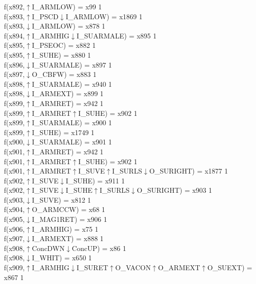 f(x892,$\uparrow$I\_ARMLOW) = x99 {1} \\
f(x893,$\uparrow$I\_PSCD$\downarrow$I\_ARMLOW) = x1869 {1} \\
f(x893,$\downarrow$I\_ARMLOW) = x878 {1} \\
f(x894,$\uparrow$I\_ARMHIG$\downarrow$I\_SUARMALE) = x895 {1} \\
f(x895,$\uparrow$I\_PSEOC) = x882 {1} \\
f(x895,$\uparrow$I\_SUHE) = x880 {1} \\
f(x896,$\downarrow$I\_SUARMALE) = x897 {1} \\
f(x897,$\downarrow$O\_CBFW) = x883 {1} \\
f(x898,$\uparrow$I\_SUARMALE) = x940 {1} \\
f(x898,$\downarrow$I\_ARMEXT) = x899 {1} \\
f(x899,$\uparrow$I\_ARMRET) = x942 {1} \\
f(x899,$\uparrow$I\_ARMRET$\uparrow$I\_SUHE) = x902 {1} \\
f(x899,$\uparrow$I\_SUARMALE) = x900 {1} \\
f(x899,$\uparrow$I\_SUHE) = x1749 {1} \\
f(x900,$\downarrow$I\_SUARMALE) = x901 {1} \\
f(x901,$\uparrow$I\_ARMRET) = x942 {1} \\
f(x901,$\uparrow$I\_ARMRET$\uparrow$I\_SUHE) = x902 {1} \\
f(x901,$\uparrow$I\_ARMRET$\uparrow$I\_SUVE$\uparrow$I\_SURLS$\downarrow$O\_SURIGHT) = x1877 {1} \\
f(x902,$\uparrow$I\_SUVE$\downarrow$I\_SUHE) = x911 {1} \\
f(x902,$\uparrow$I\_SUVE$\downarrow$I\_SUHE$\uparrow$I\_SURLS$\downarrow$O\_SURIGHT) = x903 {1} \\
f(x903,$\downarrow$I\_SUVE) = x812 {1} \\
f(x904,$\uparrow$O\_ARMCCW) = x68 {1} \\
f(x905,$\downarrow$I\_MAG1RET) = x906 {1} \\
f(x906,$\uparrow$I\_ARMHIG) = x75 {1} \\
f(x907,$\downarrow$I\_ARMEXT) = x888 {1} \\
f(x908,$\uparrow$ConcDWN$\downarrow$ConcUP) = x86 {1} \\
f(x908,$\downarrow$I\_WHIT) = x650 {1} \\
f(x909,$\uparrow$I\_ARMHIG$\downarrow$I\_SURET$\uparrow$O\_VACON$\uparrow$O\_ARMEXT$\uparrow$O\_SUEXT) = x867 {1} \\
